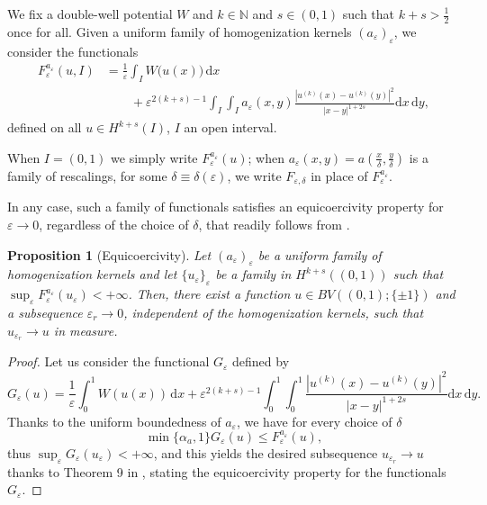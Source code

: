 \documentclass{article}
\newtheorem{Proposition}[Theorem]{Proposition}
\theoremstyle{definition}
\newcommand{\de}{\mathrm{d}}
\newcommand{\N}{\mathbb{N}}
\newcommand{\e}{\varepsilon}
\newcommand{\del}{\delta}
\def\e{\varepsilon}
\begin{document}
We fix a double-well potential $W$ and  {$k\in\N$ and $s\in(0,1)$ such that $k+s>\frac{1}{2}$} once for all. Given a uniform family of homogenization kernels $(a_\e)_\e$, we consider the functionals
\begin{align}
    \label{eq:def_F}\nonumber
    F^{a_{\scriptstyle \e}}_{\e }(u,I)&= \frac{1}{\e}\int_I W\big(u(x)\big)\,\de x \\
    &\qquad + \e^{2(k+s)-1} \int_I \int_{I}a_\e(x,y)\frac{|u^{(k)}(x)-u^{(k)}(y)|^2}{|x-y|^{1+2s}}\de x\,\de y,
\end{align}
defined on all $u\in H^{k+s}(I)$, $I$ an open interval. 

When $I=(0,1)$ we simply write $F^{a_{\scriptstyle \e}}_{\e}(u)$; when 
$a_\e(x,y)=a\left(\frac{x}{\del},\frac{y}{\del}\right)$
is a family of rescalings, for some $\delta\equiv \delta(\e)$, we  write $F_{\e,\delta}$ in place of $F^{a_{\scriptstyle \e}}_{\e}$.

In any case, such a family of functionals satisfies an equicoercivity property for $\e \to 0$, regardless of the choice of $\delta$, that readily follows from \cite{Solci_2024}.
\begin{Proposition}[Equicoercivity]
    \label{thm:compactness}
    Let $(a_\e)_\e$ be a uniform family of homogenization kernels and let $\{u_\e\}_{\e}$ be a family in $H^{k+s}((0,1))$ such that
 $\sup_\e F^{a_{\scriptstyle \e}}_{\e} (u_\e) < +\infty$. Then, there exist a function $u \in BV((0,1);\{\pm 1\})$ and a
 subsequence $\e_r \rightarrow 0$, independent of the homogenization kernels, such that $u_{\e_r} \rightarrow u$ in measure.
\end{Proposition}

\begin{proof}
Let us consider the functional $G_\e$ defined by
\begin{equation}
\label{funzionale Solci}
    G_\e(u)= \frac{1}{\e}\int_0^1 W(u(x))\,\de x +\e^{2(k+s)-1}\int_0^1\int_0^1\frac{|u^{(k)}(x)-u^{(k)}(y)|^2}{|x-y|^{1+2s}}\de x\,\de y.
\end{equation}
Thanks to the uniform boundedness of $a_\e$, we have for every choice of $\delta$
$$
\min\{\alpha_a,1\} G_\e(u) \leq F^{a_{\scriptstyle \e}}_{\e}(u),
$$
thus $\sup_\e G_\e(u_\e) < +\infty$, and this yields the desired subsequence $u_{\e_r}\to u$ thanks to Theorem 9 in \cite{Solci_2024}, stating the equicoercivity property for the functionals $G_\e$.
\end{proof}
\end{document}
